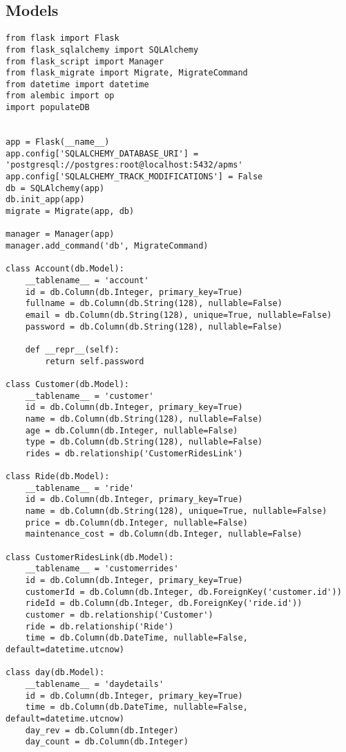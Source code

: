 \subsection{Models}
\thispagestyle{fancy}
\begin{verbatim}
from flask import Flask
from flask_sqlalchemy import SQLAlchemy
from flask_script import Manager
from flask_migrate import Migrate, MigrateCommand
from datetime import datetime
from alembic import op
import populateDB


app = Flask(__name__)
app.config['SQLALCHEMY_DATABASE_URI'] = 'postgresql://postgres:root@localhost:5432/apms'
app.config['SQLALCHEMY_TRACK_MODIFICATIONS'] = False
db = SQLAlchemy(app)
db.init_app(app)
migrate = Migrate(app, db)

manager = Manager(app)
manager.add_command('db', MigrateCommand)

class Account(db.Model):
    __tablename__ = 'account'
    id = db.Column(db.Integer, primary_key=True)
    fullname = db.Column(db.String(128), nullable=False)
    email = db.Column(db.String(128), unique=True, nullable=False)
    password = db.Column(db.String(128), nullable=False)

    def __repr__(self):
        return self.password

class Customer(db.Model):
    __tablename__ = 'customer'
    id = db.Column(db.Integer, primary_key=True)
    name = db.Column(db.String(128), nullable=False)
    age = db.Column(db.Integer, nullable=False)
    type = db.Column(db.String(128), nullable=False)
    rides = db.relationship('CustomerRidesLink')

class Ride(db.Model):
    __tablename__ = 'ride'
    id = db.Column(db.Integer, primary_key=True)
    name = db.Column(db.String(128), unique=True, nullable=False)
    price = db.Column(db.Integer, nullable=False)
    maintenance_cost = db.Column(db.Integer, nullable=False)

class CustomerRidesLink(db.Model):
    __tablename__ = 'customerrides'
    id = db.Column(db.Integer, primary_key=True)
    customerId = db.Column(db.Integer, db.ForeignKey('customer.id'))
    rideId = db.Column(db.Integer, db.ForeignKey('ride.id'))
    customer = db.relationship('Customer')
    ride = db.relationship('Ride')
    time = db.Column(db.DateTime, nullable=False, default=datetime.utcnow)

class day(db.Model):
    __tablename__ = 'daydetails'
    id = db.Column(db.Integer, primary_key=True)
    time = db.Column(db.DateTime, nullable=False, default=datetime.utcnow)
    day_rev = db.Column(db.Integer)
    day_count = db.Column(db.Integer)


\end{verbatim}
